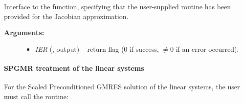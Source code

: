 \documentclass[letterpaper,10pt,english]{sphinxmanual}
\begin{document}
\begin{fulllineitems}
\label{f_interface/Usage:f/_/FARKSPARSESETJAC}
Interface to the {\hyperref[c_interface/User_callable:c.ARKSlsSetSparseJacFn]{\emph{}}} function,
specifying that the user-supplied routine {\hyperref[f_interface/Usage:f/_/FARKSPJAC]{\emph{}}} has
been provided for the Jacobian approximation.
\begin{description}
\item[{\textbf{Arguments:}}] \leavevmode\begin{itemize}
\item {} 
\emph{IER} (, output) -- return flag (0 if success,
\(\ne 0\) if an error occurred).

\end{itemize}

\end{description}

\end{fulllineitems}



\paragraph{SPGMR treatment of the linear systems}
\label{f_interface/Usage:spgmr-treatment-of-the-linear-systems}
For the Scaled Preconditioned GMRES solution of the linear systems,
the user must call the {\hyperref[f_interface/Usage:f/_/FARKSPGMR]{\emph{}}} routine:
\end{document}
